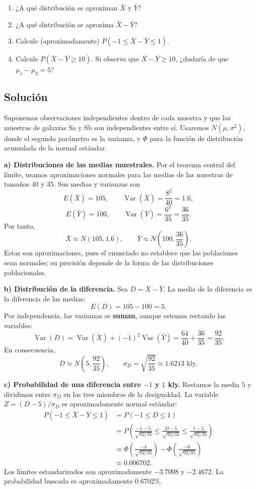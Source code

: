 \documentclass[a4paper]{article}
\begin{document}
\begin{enumerate}[label=\alph*)]
    \item ¿A qué distribución se aproximan $\bar{X}$ y $\bar{Y}$?
    \item ¿A qué distribución se aproxima $\bar{X}-\bar{Y}$?
    \item Calcule (aproximadamente) $P(-1\le\bar{X}-\bar{Y}\le 1)$.
    \item Calcule $P(\bar{X}-\bar{Y}\ge 10)$. Si observa que $\bar{X}-\bar{Y}\ge 10$, ¿dudaría de que $\mu_1-\mu_2=5$?
\end{enumerate}

\subsection{Solución}

Suponemos observaciones independientes dentro de cada muestra y que las muestras de galaxias Sa y Sb son independientes entre sí. Usaremos $N(\mu,\sigma^2)$, donde el segundo parámetro es la varianza, y $\Phi$ para la función de distribución acumulada de la normal estándar.

\textbf{a) Distribuciones de las medias muestrales.}
Por el teorema central del límite, usamos aproximaciones normales para las medias de las muestras de tamaños $40$ y $35$. Sus medias y varianzas son
\[
E(\bar{X})=105,\qquad
\operatorname{Var}(\bar{X})=\frac{8^2}{40}=1.6,
\]
\[
E(\bar{Y})=100,\qquad
\operatorname{Var}(\bar{Y})=\frac{6^2}{35}=\frac{36}{35}.
\]
Por tanto,
\[
\boxed{\bar{X}\approx N(105,1.6)},\qquad
\boxed{\bar{Y}\approx N\left(100,\frac{36}{35}\right)}.
\]
Estas son aproximaciones, pues el enunciado no establece que las poblaciones sean normales; su precisión depende de la forma de las distribuciones poblacionales.

\textbf{b) Distribución de la diferencia.}
Sea $D=\bar{X}-\bar{Y}$. La media de la diferencia es la diferencia de las medias:
\[
E(D)=105-100=5.
\]
Por independencia, las varianzas se \textbf{suman}, aunque estemos restando las variables:
\[
\operatorname{Var}(D)
=\operatorname{Var}(\bar{X})+(-1)^2\operatorname{Var}(\bar{Y})
=\frac{64}{40}+\frac{36}{35}
=\frac{92}{35}.
\]
En consecuencia,
\[
\boxed{D\approx N\left(5,\frac{92}{35}\right)},\qquad
\sigma_D=\sqrt{\frac{92}{35}}\approx 1.6213\text{ kly}.
\]

\textbf{c) Probabilidad de una diferencia entre $-1$ y $1$ kly.}
Restamos la media $5$ y dividimos entre $\sigma_D$ en los tres miembros de la desigualdad. La variable $Z=(D-5)/\sigma_D$ es aproximadamente normal estándar:
\begin{align*}
P(-1\le\bar{X}-\bar{Y}\le 1)
&=P(-1\le D\le 1)\\
&=P\left(\frac{-1-5}{\sqrt{92/35}}
\le\frac{D-5}{\sqrt{92/35}}
\le\frac{1-5}{\sqrt{92/35}}\right)\\
&\approx\Phi\left(\frac{-4}{\sqrt{92/35}}\right)
-\Phi\left(\frac{-6}{\sqrt{92/35}}\right)\\
&\approx\boxed{0.006702}.
\end{align*}
Los límites estandarizados son aproximadamente $-3.7008$ y $-2.4672$. La probabilidad buscada es aproximadamente $0.6702\%$.
\end{document}
